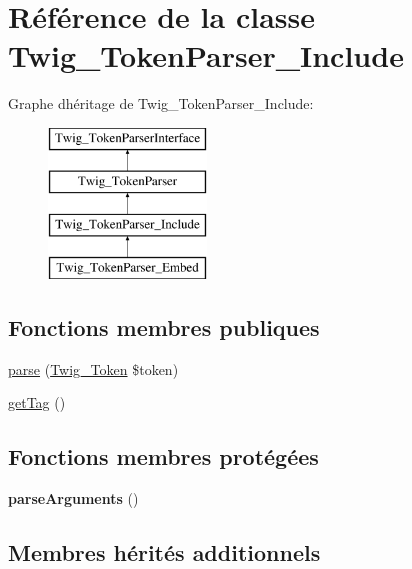\hypertarget{class_twig___token_parser___include}{}\section{Référence de la classe Twig\+\_\+\+Token\+Parser\+\_\+\+Include}
\label{class_twig___token_parser___include}
Graphe d\textquotesingle{}héritage de Twig\+\_\+\+Token\+Parser\+\_\+\+Include\+:\begin{figure}[H]
\begin{center}
\leavevmode
\includegraphics[height=4.000000cm]{class_twig___token_parser___include}
\end{center}
\end{figure}
\subsection*{Fonctions membres publiques}
\begin{DoxyCompactItemize}
\item 
\hyperlink{class_twig___token_parser___include_a5dfa2e269321584fb74e8b43dabe0efd}{parse} (\hyperlink{class_twig___token}{Twig\+\_\+\+Token} \$token)
\item 
\hyperlink{class_twig___token_parser___include_ab86ba36154b20e6bbfa3ba705f12f9d6}{get\+Tag} ()
\end{DoxyCompactItemize}
\subsection*{Fonctions membres protégées}
\begin{DoxyCompactItemize}
\item 
{\bfseries parse\+Arguments} ()\hypertarget{class_twig___token_parser___include_a7d9e9372bc6498d076030a4caf7bc188}{}\label{class_twig___token_parser___include_a7d9e9372bc6498d076030a4caf7bc188}

\end{DoxyCompactItemize}
\subsection*{Membres hérités additionnels}


